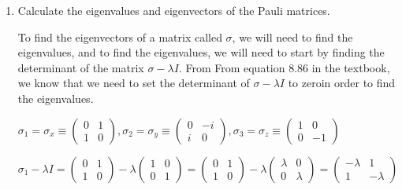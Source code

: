 \documentclass[fleqn]{article}
\begin{document}
  \begin{enumerate}
    \item Calculate the eigenvalues and eigenvectors of the Pauli matrices.

      \textcolor{hwColor}{ 
        To find the eigenvectors of a matrix called $\sigma$, we will need to find the eigenvalues, and to find the eigenvalues, we will need to start by finding the determinant of the matrix $\sigma-\lambda I$. From 
        From equation 8.86 in the textbook, we know that we need to set the determinant of $\sigma-\lambda I$ to zeroin order to find the eigenvalues. 
      }

      \textcolor{hwColor}{ 
        $\sigma_1=\sigma_x\equiv
        \begin{pmatrix}
          0 & 1 \\
          1 & 0 
        \end{pmatrix}
         , \sigma_2=\sigma_y\equiv
        \begin{pmatrix}
          0 & -i \\
          i & 0 
        \end{pmatrix}
        , \sigma_3=\sigma_z\equiv
        \begin{pmatrix}
          1 & 0 \\
          0 & -1 
        \end{pmatrix}
        $
      }

      \bigbreak

      \textcolor{hwColor}{ 
        $\sigma_1-\lambda I=
          \begin{pmatrix}
            0 & 1 \\
            1 & 0 
          \end{pmatrix}-
          \lambda \begin{pmatrix}
            1 & 0 \\
            0 & 1
          \end{pmatrix}=
          \begin{pmatrix}
            0 & 1 \\
            1 & 0 
          \end{pmatrix}-
          \lambda \begin{pmatrix}
            \lambda & 0 \\
            0 & \lambda
          \end{pmatrix}=
          \begin{pmatrix}
            -\lambda & 1 \\
            1 & -\lambda
          \end{pmatrix}
        $
      }


\end{enumerate}
\end{document}
